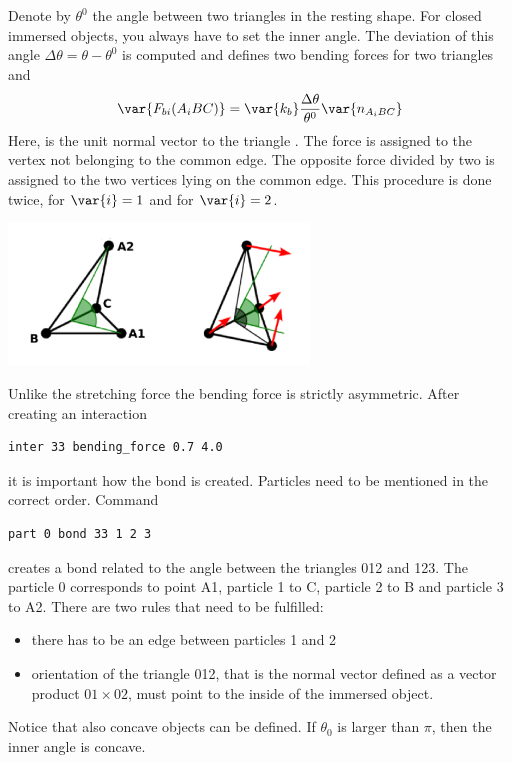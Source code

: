 Denote by $\theta^0$ the angle between two triangles in the resting shape. For 
closed immersed objects, you always have to set the inner angle. The deviation 
of this angle $\Delta \theta = \theta - \theta^0$ is computed and defines two 
bending forces for two triangles  and 
\begin{equation}
\var{F_{bi}(A_iBC)} = \var{k_b}\frac{\Delta \theta}{\theta^0} \var{n_{A_iBC}}
\end{equation}
Here,  is the unit normal vector to the triangle . The 
force  is assigned to the vertex not belonging to the common 
edge. The opposite force divided by two is assigned to the two vertices lying on 
the common edge. This procedure is done twice, for $\var{i}=1$ and for 
$\var{i}=2$.

\begin{center}
  \includegraphics[width=8cm]{figures/bending.png}
\end{center}

Unlike the stretching force the bending force is strictly asymmetric. After 
creating an interaction
\begin{verbatim} 
inter 33 bending_force 0.7 4.0
\end{verbatim}
it is important how the bond is created. Particles need to be mentioned in the 
correct order. Command
\begin{verbatim} 
part 0 bond 33 1 2 3
\end{verbatim}
creates a bond related to the angle between the triangles 012 and 123. The particle 
0 corresponds to point A1, particle 1 to C, particle 2 to B and particle 3 to A2. 
There are two rules that need to be fulfilled:
\begin{itemize}
\item there has to be an edge between particles 1 and 2
\item orientation of the triangle 012, that is the normal vector 
defined as a vector product $01 \times 02$, must point to the inside of the immersed 
object.
\end{itemize}
Notice that also concave objects can be defined. If $\theta_0$ is larger than $\pi$, 
then the inner angle is concave.

